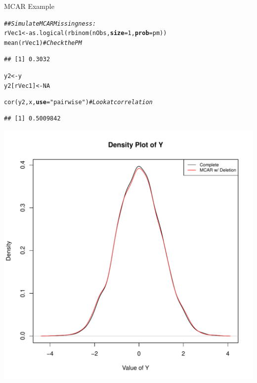 \documentclass{beamer}\usepackage[]{graphicx}\usepackage[]{color}
\makeatletter
\newcommand{\hlnum}[1]{\textcolor[rgb]{0.69,0.494,0}{#1}}%
\newcommand{\hlstr}[1]{\textcolor[rgb]{0.749,0.012,0.012}{#1}}%
\newcommand{\hlcom}[1]{\textcolor[rgb]{0.514,0.506,0.514}{\textit{#1}}}%
\newcommand{\hlstd}[1]{\textcolor[rgb]{0,0,0}{#1}}%
\newcommand{\hlkwb}[1]{\textcolor[rgb]{0,0.341,0.682}{#1}}%
\newcommand{\hlkwc}[1]{\textcolor[rgb]{0,0,0}{\textbf{#1}}}%
\newcommand{\hlkwd}[1]{\textcolor[rgb]{0.004,0.004,0.506}{#1}}%
\newenvironment{kframe}{%
 \def\at@end@of@kframe{}%
 \ifinner\ifhmode%
  \def\at@end@of@kframe{\end{minipage}}%
  \begin{minipage}{\columnwidth}%
 \fi\fi%
 \def\FrameCommand##1{\hskip\@totalleftmargin \hskip-\fboxsep
 \colorbox{shadecolor}{##1}\hskip-\fboxsep
     \hskip-\linewidth \hskip-\@totalleftmargin \hskip\columnwidth}%
 \MakeFramed {\advance\hsize-\width
   \@totalleftmargin\z@ \linewidth\hsize
   \@setminipage}}%
 {\par\unskip\endMakeFramed%
 \at@end@of@kframe}
\newenvironment{knitrout}{}{} %
\makeatother
\begin{document}

\begin{frame}{MCAR Example}
  
\begin{knitrout}\footnotesize
{}\color{fgcolor}\begin{kframe}
\begin{alltt}
\hlcom{## Simulate MCAR Missingness:}
\hlstd{rVec1} \hlkwb{<-} \hlkwd{as.logical}\hlstd{(}\hlkwd{rbinom}\hlstd{(nObs,} \hlkwc{size} \hlstd{=} \hlnum{1}\hlstd{,} \hlkwc{prob} \hlstd{= pm))}
\hlkwd{mean}\hlstd{(rVec1)} \hlcom{# Check the PM}
\end{alltt}
\begin{verbatim}
## [1] 0.3032
\end{verbatim}
\begin{alltt}
\hlstd{y2} \hlkwb{<-} \hlstd{y}
\hlstd{y2[rVec1]} \hlkwb{<-} \hlnum{NA}

\hlkwd{cor}\hlstd{(y2, x,} \hlkwc{use} \hlstd{=} \hlstr{"pairwise"}\hlstd{)} \hlcom{# Look at correlation}
\end{alltt}
\begin{verbatim}
## [1] 0.5009842
\end{verbatim}
\end{kframe}
\end{knitrout}

\pagebreak

\begin{knitrout}\footnotesize
{}\color{fgcolor}

{\centering \includegraphics[width=0.65\linewidth]{figure/unnamed-chunk-9-1} 

}



\end{knitrout}

\end{frame}
\end{document}
